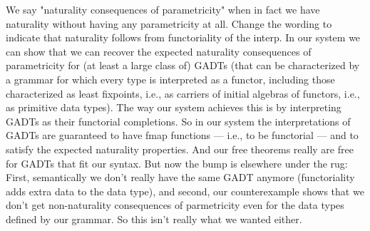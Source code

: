 \documentclass[acmsmall,screen,review,anonymous]{acmart}
\theoremstyle{definition}
\begin{document}
{\color{violet} We say "naturality consequences of parametricity"
when in fact we have naturality without having any parametricity at all.
Change the wording to indicate that naturality follows from
functoriality of the interp.}
In our system we can show that we can recover the expected naturality
consequences of parametricity for (at least a large class of) GADTs
(that can be characterized by a grammar for which every type is
interpreted as a functor, including those characterized as least
fixpoints, i.e., as carriers of initial algebras of functors, i.e., as
primitive data types). The way our system achieves this is by
interpreting GADTs as their functorial completions. So in our system
the interpretations of GADTs are guaranteed to have fmap functions ---
i.e., to be functorial --- and to satisfy the expected naturality
properties. And our free theorems really are free for GADTs that fit
our syntax. But now the bump is elsewhere under the rug: First,
semantically we don't really have the same GADT anymore (functoriality
adds extra data to the data type), and second, our counterexample
shows that we don't get non-naturality consequences of parmetricity
even for the data types defined by our grammar.  So this isn't really
what we wanted either.



\pagebreak
\end{document}
